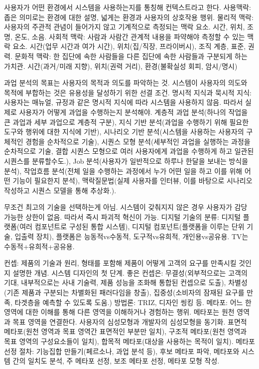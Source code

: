 
\bitmz
  \itm 사용자가 어떤 환경에서 시스템을 사용하는지를 통칭해 컨텍스트라고 한다.
  \itm 사용맥락: 좁은 의미로는 환경에 대한 설명, 넓게는 환경과 사용자의 상호작용 행위.
  \itm 물리적 맥락: 사용자의 주관적 관념이 들어가지 않고 기계적으로 측정되는 맥락 요소. 시간, 위치, 조명, 온도, 소음.
  \itm 사회적 맥락: 사람과 사람간 관계적 내용을 파약해야 측정할 수 있는 맥락 요소. 시간(업무 시간과 여가 시간), 위치(집/직장, 프라이버시), 조직 계층, 표준, 권력.
  \itm 문화적 맥락: 한 집단에 속한 사람들을 다른 집단에 속한 사람들과 구분되게 하는 가치관. 시간(과거/미래 지향), 위치(권력 거리), 환경(불확실성 회피, 암시/명시)
\eitmz


\bitmz
  \itm 과업 분석의 목표는 사용자의 목적과 의도를 파악하는 것. 시스템이 사용자의 의도와 목적에 부합하는 것은 유용성을 달성하기 위한 선결 조건.
  \itm 명시적 지식과 묵시적 지식: 사용자는 매뉴얼, 규정과 같은 명시적 지식에 따라 시스템을 사용하지 않음. 따라서 실제로 사용자가 어떻게 과업을 수행하는지 분석해야.
  \itm 계층적 과업 분석(하나의 작업을 큰 과업과 세부 과업으로 계층적 구분), 지식 기반 분석(과업을 수행하기 위해 필요한 도구와 행위에 대한 지식에 기반), 시나리오 기반 분석(시스템을 사용하는 사용자의 구체적인 경험을 순차적으로 기술), 시퀀스 모형 분석(세부적인 과업을 실행하는 과정을 순차적으로 기술, 결합 시퀀스 모형으로 여러 사용자에게 과업을 수행하게 하고 일관된 시퀀스를 분류할수도.), Job 분석(사용자가 일반적으로 하루나 한달을 보내는 방식을 분석), 작업흐름 분석(전체 일을 수행하는 과정에서 누가 어떤 일을 하고 이를 위해 어떤 기능이 필요한지 분석), 맥락질문법(실제 사용자를 인터뷰, 이를 바탕으로 시나리오 작성하고 시퀀스 모델을 통해 추상화.).
\eitmz


\bitmz
  \itm 무조건 최고의 기술을 선택하는게 아님. 시스템이 갖춰지지 않은 경우 사용자가 감당 가능한 상한이 없음. 따라서 즉시 파괴적 혁신이 가능.
  \itm 디지털 기술의 분류: 디지털 플랫폼(여러 컴포넌트로 구성된 통합 시스템), 디지털 컴포넌트(플랫폼을 이루는 단위 기술, 입출력 장치), 플랫폼은 능동적vs수동적, 도구적vs유희적, 개인용vs공유용. TV는 수동적+유희적+공유용.
\eitmz


\bitmz
  \itm 컨셉: 제품의 기술과 원리, 형태를 포함해 제품이 어떻게 고객의 요구를 만족시킬 것인지 설명한 개념. 시스템 디자인의 첫 단계.
  \itm 좋은 컨셉은: 무결성(외부적으로는 고객의 기대, 내부적으로는 사내 기술력, 제품 성능을 조화해 통합된 컨셉으로 도출), 차별성(기존 제품과 구분되는 차별화된 패러다임을 창출), 집중성(소비자의 잠재된 요구를 만족, 타겟층을 예측할 수 있도록 도움.)
  \itm 방법론: TRIZ, 디자인 씽킹 등.
  \itm 메타포: 어느 한 영역에 대한 이해를 통해 다른 영역을 이해하거나 경험하는 행위. 메타포는 원천 영역과 목표 영역을 연결한다. 사용자의 심성모형과 개발자의 심성모형을 동기화.
  \itm 표면적 메타포(원천 영역과 목표 영역간 표면적인 부분만 일치), 구조적 메타포(원천 영역과 목표 영역의 구성요소들이 일치), 합목적 메타포(대상을 사용하는 목적이 일치).
  \itm 메타포 선정 절차: 기능집합 만들기(페르소나, 과업 분석 등), 후보 메타포 파악, 메타포와 시스템 간의 일치도 분석, 주 메타포 선정, 보조 메타포 선정, 메타포 모형 작성.
\eitmz


